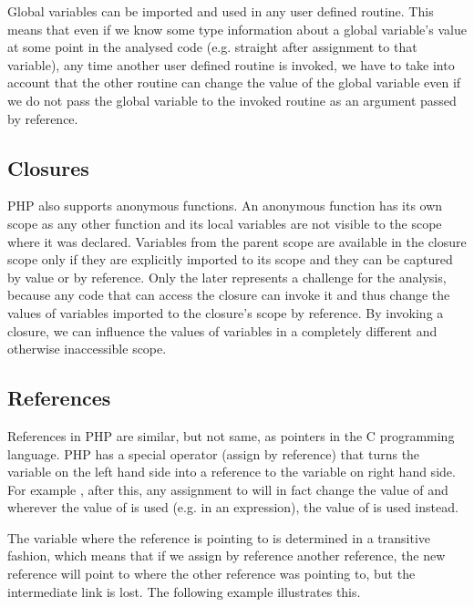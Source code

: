     Global variables can be imported and used in any user defined 
    routine. This means that even if we know some type information 
    about a global variable's value at some point in the analysed 
    code (e.g. straight after assignment to that variable), 
    any time another user defined routine is invoked, we 
    have to take into account that the other routine can 
    change the value of the global variable even if we do not 
    pass the global variable to the invoked routine 
    as an argument passed by reference.

    \subsection{Closures}
    PHP also supports anonymous functions. An anonymous function has its 
    own scope as any other function and its local variables are not visible 
    to the scope where it was declared. Variables from the parent 
    scope are available in the closure scope only if they are 
    explicitly imported to its scope and they can be captured 
    by value or by reference. Only the later represents a 
    challenge for the analysis, because any code that can 
    access the closure can invoke it and thus change the 
    values of variables imported to the closure's scope 
    by reference. By invoking a closure, we can influence 
    the values of variables in a completely different 
    and otherwise inaccessible scope.
    
    \subsection{References}
    References in PHP are similar, but not same, as pointers 
    in the C programming language. PHP has a special 
    operator \code{=\&} (assign by reference) that turns 
    the variable on the 
    left hand side into a reference to the 
    variable on right hand side. For example , 
    after this, any assignment 
    to  will in fact change the 
    value of  and wherever 
    the value of  is used (e.g. in an expression), 
    the value of  is used instead.
    
    The variable where the reference is pointing to is determined 
    in a transitive fashion, which means that if we assign 
    by reference another reference, the new reference will 
    point to where the other reference was pointing to, 
    but the intermediate link is lost. The following example 
    illustrates this.
    
